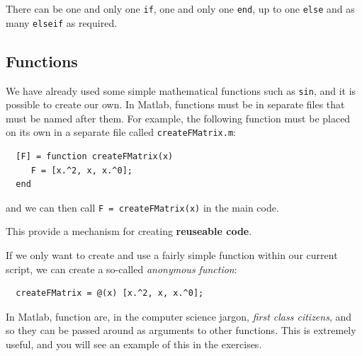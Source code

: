 \documentclass[12pt,a4paper]{tufte-handout}
\begin{document}
There can be one and only one \texttt{if}, one and only one \texttt{end}, up to one \texttt{else} and as many \texttt{elseif} as required.

\subsection{Functions}
We have already used some simple mathematical functions such as \texttt{sin}, and it is possible to create our own. In Matlab, functions must be in separate files that must be named after them. For example, the following function must be placed on its own in a separate file called \texttt{createFMatrix.m}:
\begin{lstlisting}
  [F] = function createFMatrix(x)
     F = [x.^2, x, x.^0];
  end
\end{lstlisting}

and we can then call \texttt{F = createFMatrix(x)} in the main code.

This provide a mechanism for creating \textbf{reuseable code}.

If we only want to create and use a fairly simple function within our current script, we can create a so-called \textit{anonymous function}:

\begin{lstlisting}
  createFMatrix = @(x) [x.^2, x, x.^0];
\end{lstlisting}

In Matlab, function are, in the computer science jargon, \textit{first class citizens}, and so they can be passed around as arguments to other functions. This is extremely useful, and you will see an example of this in the exercises.
\end{document}
